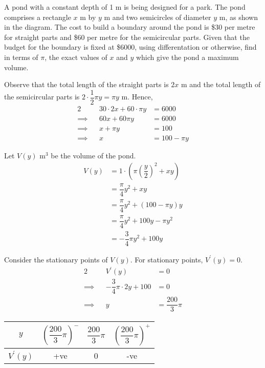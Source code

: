 \documentclass{echw}
\begin{document}
        \noindent A pond with a constant depth of 1 m is being designed for a park. The pond comprises a rectangle $x$ m by $y$ m and two semicircles of diameter $y$ m, as shown in the diagram. The cost to build a boundary around the pond is \$30 per metre for straight parts and \$60 per metre for the semicircular parts. Given that the budget for the boundary is fixed at \$6000, using differentation or otherwise, find in terms of $\pi$, the exact values of $x$ and $y$ which give the pond a maximum volume.

    \solution
        Observe that the total length of the straight parts is $2x$ m and the total length of the semicircular parts is $2 \cdot \dfrac12 \pi y = \pi y$ m. Hence,
        \begin{alignat*}{2}
            &&30 \cdot 2x + 60 \cdot \pi y &= 6000\\
            \implies&&60x + 60 \pi y &= 6000\\
            \implies&&x + \pi y &= 100\\
            \implies&&x &= 100 - \pi y
        \end{alignat*}

        Let $V(y)$ m$^3$ be the volume of the pond.
        \begin{align*}
            V(y) &= 1 \cdot \left(\pi \left(\dfrac{y}2\right)^2 + xy\right)\\
            &= \dfrac{\pi}4 y^2 + xy\\
            &= \dfrac{\pi}4 y^2 + (100 - \pi y )y\\
            &= \dfrac{\pi}4 y^2 + 100y - \pi y^2\\
            &= - \dfrac{3}4 \pi y^2 + 100y
        \end{align*}

        Consider the stationary points of $V(y)$. For stationary points, $V^\prime(y) = 0$.
        \begin{alignat*}{2}
            &&V^\prime(y) &= 0\\
            \implies&&-\dfrac34 \pi \cdot 2y + 100 &= 0\\
            \implies&& y &= \dfrac{200}3 \pi
        \end{alignat*}

        \begin{table}[h]
            \centering
            \begin{tabular}{|c|c|c|c|}
            \hline
            $y$ & $\left(\dfrac{200}3 \pi\right)^-$ & $\dfrac{200}3 \pi$ & $\left(\dfrac{200}3 \pi\right)^+$ \\\hline
            $V^\prime(y)$ & +ve   & 0 & -ve   \\[1ex]\hline
            \end{tabular}
        \end{table}
\end{document}
